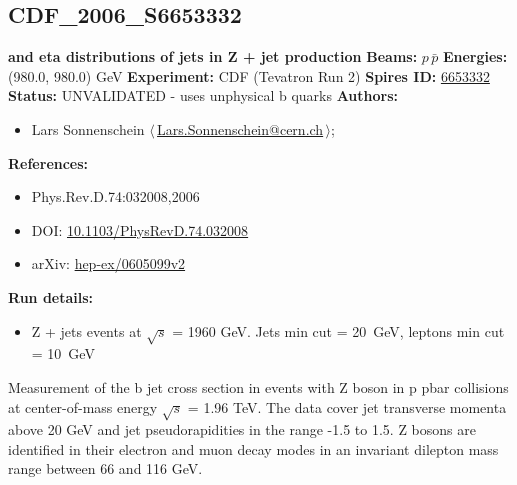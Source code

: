 \subsection[CDF\_2006\_S6653332]{CDF\_2006\_S6653332\,\cite{Abulencia:2006ce}}
\textbf{\pT and eta distributions of jets in Z + jet production}\newline
\textbf{Beams:} $p$\,$\bar{p}$ \newline
\textbf{Energies:} (980.0, 980.0) GeV \newline
\textbf{Experiment:} CDF (Tevatron Run 2) \newline
\textbf{Spires ID:} \href{http://www.slac.stanford.edu/spires/find/hep/www?rawcmd=key+6653332}{6653332}\newline
\textbf{Status:} UNVALIDATED - uses unphysical b quarks\newline
\textbf{Authors:}
\begin{itemize}
  \item Lars Sonnenschein $\langle\,$\href{mailto:Lars.Sonnenschein@cern.ch}{Lars.Sonnenschein@cern.ch}$\,\rangle$;
\end{itemize}
\textbf{References:}
\begin{itemize}
  \item Phys.Rev.D.74:032008,2006
  \item DOI: \href{http://dx.doi.org/10.1103/PhysRevD.74.032008}{10.1103/PhysRevD.74.032008}
  \item arXiv: \href{http://arxiv.org/abs/hep-ex/0605099v2}{hep-ex/0605099v2}
\end{itemize}
\textbf{Run details:}
\begin{itemize}

  \item Z + jets events at \ensuremath{\sqrt{s}} = 1960 GeV. Jets min \pT cut = 20~GeV, leptons min \pT cut = 10~GeV\end{itemize}

\noindent Measurement of the b jet cross section in events with Z boson in p pbar collisions at center-of-mass energy \ensuremath{\sqrt{s}} = 1.96 TeV. The data cover jet transverse momenta above 20 GeV and jet pseudorapidities in the range -1.5 to 1.5. Z bosons are identified in their electron and muon decay modes in an invariant dilepton mass range between 66 and 116 GeV.

\clearpage


\clearpage

